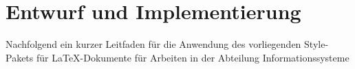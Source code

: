 \chapter{Entwurf und Implementierung} 
Nachfolgend ein kurzer Leitfaden f\"{u}r die Anwendung des
vorliegenden Style-Pakets f\"{u}r LaTeX-Dokumente f\"{u}r Arbeiten in der
Abteilung Informationssysteme